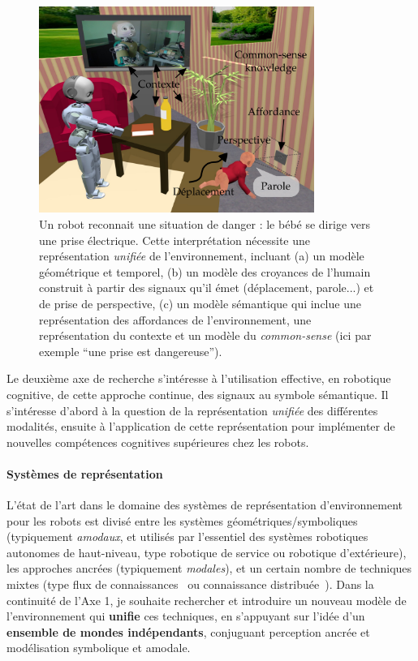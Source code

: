 \documentclass[a4paper]{article}
\begin{document}
\begin{figure}
    \centering
\includegraphics[width=0.8\textwidth]{figs/signaux}
\caption{\small Un robot reconnait une situation de danger : le bébé se dirige
    vers une prise électrique. Cette interprétation nécessite une représentation
    \emph{unifiée} de l'environnement, incluant (a) un modèle géométrique et
    temporel, (b) un modèle des croyances de l'humain construit à partir des
    signaux qu'il émet (déplacement, parole...) et de prise de perspective, (c)
    un modèle sémantique qui inclue une représentation des affordances de
    l'environnement, une représentation du contexte et un modèle du
    \emph{common-sense} (ici par exemple ``une prise est dangereuse'').}

\label{babyplug}
\end{figure}

Le deuxième axe de recherche s'intéresse à l'utilisation effective, en robotique
cognitive, de cette approche continue, des signaux au symbole sémantique. Il
s'intéresse d'abord à la question de la représentation \emph{unifiée} des
différentes modalités, ensuite à l'application de cette représentation pour
implémenter de nouvelles compétences cognitives supérieures chez les robots.

\paragraph{Systèmes de représentation}

L'état de l'art dans le domaine des systèmes de représentation d'environnement
pour les robots est divisé entre les systèmes géométriques/symboliques
(typiquement \emph{amodaux}, et utilisés par l'essentiel des systèmes robotiques
autonomes de haut-niveau, type robotique de service ou robotique d'extérieure),
les approches ancrées (typiquement \emph{modales}), et un certain nombre de
techniques mixtes (type flux de connaissances~\cite{heintz2004dyknow} ou
connaissance distribuée~\cite{hawes2007balt}). Dans la continuité de l'Axe 1, je
souhaite rechercher et introduire un nouveau modèle de l'environnement qui
\textbf{unifie} ces techniques, en s'appuyant sur l'idée d'un \textbf{ensemble
de mondes indépendants}, conjuguant perception ancrée et modélisation symbolique
et amodale.
\end{document}
